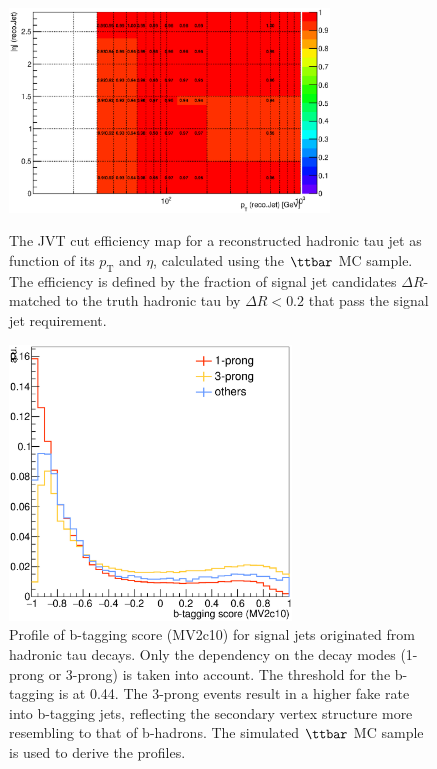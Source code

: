 \begin{figure}[htbp]
  \begin{center}
    \begin{minipage}[t]{.45\textwidth}
      \centering
      \includegraphics[width=85mm]{figures/BGestimation/ObjReplacement/method/tauRF/heff_vs_recoJetPt_recoJetEta.eps}
      \caption{The JVT cut efficiency map for a reconstructed hadronic tau jet as function of its $p_{\mathrm{T}}$ and $\eta$, calculated using the $\ttbar$ MC sample. The efficiency is defined by the fraction of signal jet candidates $\Delta R$-matched to the truth hadronic tau by $\Delta R<0.2$ that pass the signal jet requirement. }
      \label{fig::BGestimation::objRep::effJVT}
    \end{minipage}
    \hfill
    \begin{minipage}[t]{.45\textwidth}
      \centering
      \includegraphics[width=75mm]{figures/BGestimation/ObjReplacement/method/tauRF/hadTau_bTagScore.eps}
      \caption{Profile of b-tagging score (MV2c10) for signal jets originated from hadronic tau decays. Only the dependency on the decay modes (1-prong or 3-prong) is taken into account. The threshold for the b-tagging is at 0.44. 
The 3-prong events result in a higher fake rate into b-tagging jets, reflecting the secondary vertex structure more resembling to that of b-hadrons. The simulated $\ttbar$ MC sample is used to derive the profiles. }
      \label{fig::BGestimation::objRep::tau_bTagScore}
    \end{minipage}
  \end{center}
\end{figure}

